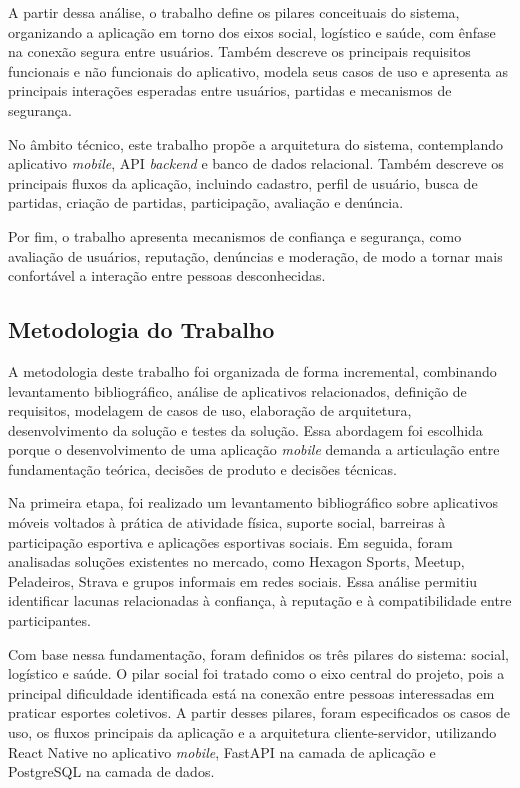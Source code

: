 \documentclass[a4paper, 12pt]{article}
\begin{document}
\begin{justify}
A partir dessa análise, o trabalho define os pilares conceituais do sistema, organizando a aplicação em torno dos eixos social, logístico e saúde, com ênfase na conexão segura entre usuários. Também descreve os principais requisitos funcionais e não funcionais do aplicativo, modela seus casos de uso e apresenta as principais interações esperadas entre usuários, partidas e mecanismos de segurança.

No âmbito técnico, este trabalho propõe a arquitetura do sistema, contemplando aplicativo \textit{mobile}, API \textit{backend} e banco de dados relacional. Também descreve os principais fluxos da aplicação, incluindo cadastro, perfil de usuário, busca de partidas, criação de partidas, participação, avaliação e denúncia.

Por fim, o trabalho apresenta mecanismos de confiança e segurança, como avaliação de usuários, reputação, denúncias e moderação, de modo a tornar mais confortável a interação entre pessoas desconhecidas.

\subsection{Metodologia do Trabalho}

A metodologia deste trabalho foi organizada de forma incremental, combinando levantamento bibliográfico, análise de aplicativos relacionados, definição de requisitos, modelagem de casos de uso, elaboração de arquitetura, desenvolvimento da solução e testes da solução. Essa abordagem foi escolhida porque o desenvolvimento de uma aplicação \textit{mobile} demanda a articulação entre fundamentação teórica, decisões de produto e decisões técnicas.

Na primeira etapa, foi realizado um levantamento bibliográfico sobre aplicativos móveis voltados à prática de atividade física, suporte social, barreiras à participação esportiva e aplicações esportivas sociais. Em seguida, foram analisadas soluções existentes no mercado, como Hexagon Sports, Meetup, Peladeiros, Strava e grupos informais em redes sociais. Essa análise permitiu identificar lacunas relacionadas à confiança, à reputação e à compatibilidade entre participantes.

Com base nessa fundamentação, foram definidos os três pilares do sistema: social, logístico e saúde. O pilar social foi tratado como o eixo central do projeto, pois a principal dificuldade identificada está na conexão entre pessoas interessadas em praticar esportes coletivos. A partir desses pilares, foram especificados os casos de uso, os fluxos principais da aplicação e a arquitetura cliente-servidor, utilizando React Native no aplicativo \textit{mobile}, FastAPI na camada de aplicação e PostgreSQL na camada de dados.


\end{justify}
\end{document}
